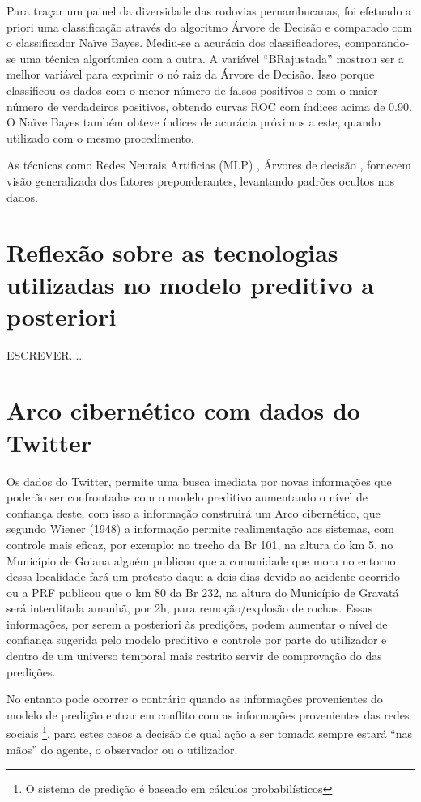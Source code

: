 Para traçar um painel da diversidade das rodovias pernambucanas, foi efetuado a priori uma classificação através do algoritmo Árvore de Decisão e comparado com o classificador Naïve Bayes. Mediu-se a acurácia dos classificadores, comparando-se uma técnica algorítmica com a outra. A variável ``BRajustada'' mostrou ser a melhor variável para exprimir o nó raiz da Árvore de Decisão. Isso porque classificou os dados com o menor número de falsos positivos e com o maior número de verdadeiros positivos, obtendo curvas ROC com índices acima de 0.90. O Naïve Bayes também obteve índices de acurácia próximos a este, quando utilizado com o mesmo procedimento.

As técnicas como Redes Neurais Artificias (MLP) \cite{DecisaoCredito}, Árvores de decisão \cite{DataMining},  
 fornecem visão generalizada dos fatores preponderantes, levantando padrões ocultos nos dados. 


\section{Reflexão sobre as tecnologias utilizadas no modelo preditivo a posteriori}\label{resultPost}

ESCREVER....

\pagebreak

\section{Arco cibernético com dados do Twitter}

Os dados do Twitter, permite uma busca imediata por novas informações que poderão ser confrontadas com o 
modelo preditivo aumentando o nível de confiança deste, com isso a informação construirá um Arco cibernético, que segundo Wiener (1948) a 
informação permite realimentação aos sistemas, com controle mais eficaz, por exemplo: no trecho da Br 101, na altura do km 5, no 
Município de Goiana alguém publicou que a comunidade que mora no entorno dessa localidade fará um protesto daqui a dois dias devido ao 
acidente ocorrido ou a PRF publicou que o km 80 da Br 232, na altura do Município de Gravatá será interditada amanhã, por 2h, para 
remoção/explosão de rochas. 
Essas informações, por serem a posteriori às predições, podem aumentar o nível de confiança sugerida pelo modelo preditivo e controle por 
parte do utilizador e dentro de um universo temporal mais restrito servir de comprovação do das predições.

No entanto pode ocorrer o contrário quando as informações provenientes do modelo de predição entrar em conflito com as informações 
provenientes das redes sociais \footnote{O sistema de predição é baseado em cálculos probabilísticos}, para estes casos a decisão de 
qual ação a ser tomada sempre estará ``nas mãos'' do agente, o observador ou o utilizador.

